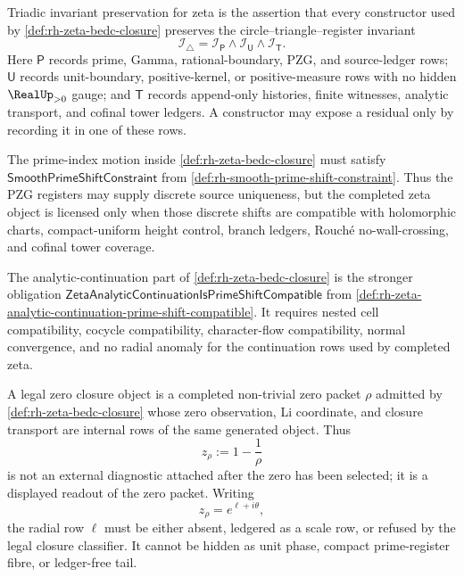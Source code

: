 \begin{definition}
\label{def:rh-triadic-invariant-preservation-zeta}
Triadic invariant preservation for zeta is the assertion that every
constructor used by \autoref{def:rh-zeta-bedc-closure} preserves the
circle--triangle--register invariant
$$
\mathcal I_{\triangle}
=
\mathcal I_{\mathsf P}
\wedge
\mathcal I_{\mathsf U}
\wedge
\mathcal I_{\mathsf T}.
$$
Here $\mathsf P$ records prime, Gamma, rational-boundary, PZG, and
source-ledger rows; $\mathsf U$ records unit-boundary, positive-kernel,
or positive-measure rows with no hidden $\RealUp_{>0}$ gauge; and
$\mathsf T$ records append-only histories, finite witnesses, analytic
transport, and cofinal tower ledgers. A constructor may expose a residual
only by recording it in one of these rows.
\end{definition}

\begin{principle}
\label{prin:rh-analytic-prime-shifts-part-of-zeta-closure}
The prime-index motion inside \autoref{def:rh-zeta-bedc-closure} must
satisfy $\mathsf{SmoothPrimeShiftConstraint}$ from
\autoref{def:rh-smooth-prime-shift-constraint}. Thus the PZG registers
may supply discrete source uniqueness, but the completed zeta object is
licensed only when those discrete shifts are compatible with holomorphic
charts, compact-uniform height control, branch ledgers, Rouch\'e
no-wall-crossing, and cofinal tower coverage.
\end{principle}

\begin{principle}
\label{prin:rh-zeta-continuation-prime-shift-compatible}
The analytic-continuation part of \autoref{def:rh-zeta-bedc-closure} is
the stronger obligation
$\mathsf{ZetaAnalyticContinuationIsPrimeShiftCompatible}$ from
\autoref{def:rh-zeta-analytic-continuation-prime-shift-compatible}. It
requires nested cell compatibility, cocycle compatibility,
character-flow compatibility, normal convergence, and no radial anomaly
for the continuation rows used by completed zeta.
\end{principle}

\begin{definition}
\label{def:rh-legal-zero-closure-object}
A legal zero closure object is a completed non-trivial zero packet
$\rho$ admitted by \autoref{def:rh-zeta-bedc-closure} whose zero
observation, Li coordinate, and closure transport are internal rows of
the same generated object. Thus
$$
z_{\rho}:=1-\frac1{\rho}
$$
is not an external diagnostic attached after the zero has been selected;
it is a displayed readout of the zero packet. Writing
$$
z_{\rho}=e^{\ell+i\theta},
$$
the radial row $\ell$ must be either absent, ledgered as a scale row, or
refused by the legal closure classifier. It cannot be hidden as unit
phase, compact prime-register fibre, or ledger-free tail.
\end{definition}

